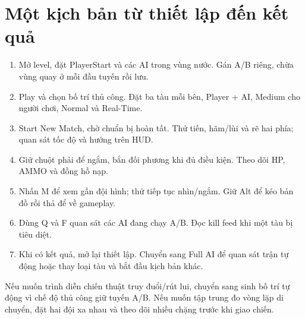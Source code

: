 \documentclass[11pt,a4paper,oneside]{report}
\begin{document}
\section{Một kịch bản từ thiết lập đến kết quả}
\begin{enumerate}
\item Mở level, đặt PlayerStart và các AI trong vùng nước. Gán A/B riêng, chừa vùng quay ở mỗi đầu tuyến rồi lưu.
\item Play và chọn bố trí thủ công. Đặt ba tàu mỗi bên, Player + AI, Medium cho người chơi, Normal và Real-Time.
\item Start New Match, chờ chuẩn bị hoàn tất. Thử tiến, hãm/lùi và rẽ hai phía; quan sát tốc độ và hướng trên HUD.
\item Giữ chuột phải để ngắm, bắn đối phương khi đủ điều kiện. Theo dõi HP, AMMO và đồng hồ nạp.
\item Nhấn M để xem gần đội hình; thử tiếp tục nhìn/ngắm. Giữ Alt để kéo bản đồ rồi thả để về gameplay.
\item Dùng Q và F quan sát các AI đang chạy A/B. Đọc kill feed khi một tàu bị tiêu diệt.
\item Khi có kết quả, mở lại thiết lập. Chuyển sang Full AI để quan sát trận tự động hoặc thay loại tàu và bắt đầu kịch bản khác.
\end{enumerate}

Nếu muốn trình diễn chiến thuật truy đuổi/rút lui, chuyển sang sinh bố trí tự động vì chế độ thủ công giữ tuyến A/B. Nếu muốn tập trung đo vòng lặp di chuyển, đặt hai đội xa nhau và theo dõi nhiều chặng trước khi giao chiến.
\end{document}
